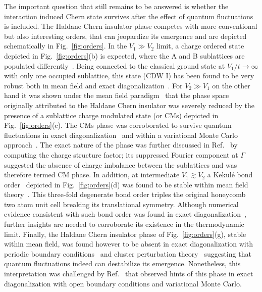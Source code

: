 \documentclass[aps,prx,10pt,twocolumn,floatfix,superscriptaddress,showpacs,numerical,footinbib]{revtex4-1}
\begin{document}
The important question that still remains to be answered is whether the interaction induced Chern state survives 
after the effect of quantum fluctuations is included.
%
The Haldane Chern insulator phase competes with more conventional but also interesting orders, 
that can jeopardize its emergence and are depicted schematically in Fig.~\ref{fig:orders}.
%
In the $V_{1} \gg V_{2}$ limit, a charge ordered state depicted in Fig.~\ref{fig:orders}(b) is expected, 
where the A and B sublattices are populated differently~\cite{RQHZ08,WCT14}.
%
Being connected to the classical ground state at $V_{1}/t \to \infty$ with only one occupied sublattice, this state (CDW I) has been found to be very robust both in mean field and exact diagonalization~\cite{GGNVC13,DH14}.
%
For $V_{2}\gg V_{1}$ on the other hand it was shown under the mean field paradigm~\cite{GCC13} that the phase space originally attributed to the Haldane Chern insulator 
was severely reduced by the presence of a sublattice charge modulated state (or CMs) depicted in Fig.~\ref{fig:orders}(c).
%
The CMs phase was corroborated to survive quantum fluctuations in exact diagonalization~\cite{GGNVC13,DH14,DCH14} 
and within a variational Monte Carlo approach~\cite{DCH14}.
%
The exact nature of the phase was further discussed in Ref.~\cite{DH14} by computing the charge structure factor; 
its suppressed Fourier component at $\Gamma$ suggested the absence of charge imbalance between the sublattices and 
was therefore termed CM phase.
%
In addition, at intermediate $V_{1}\gtrsim V_{2}$ a Kekul\'e bond order~\cite{C00,HCM07,RH10,RJH13} 
depicted in Fig.~\ref{fig:orders}(d) was found to be stable within mean field theory~\cite{WF10}.
%
This three-fold degenerate bond order triples the original honeycomb two atom unit cell breaking its translational symmetry.
%
Although numerical evidence consistent with such bond order was found in exact diagonalization~\cite{GGNVC13}, further insights are needed to corroborate its existence in the thermodynamic limit.
%
Finally, the Haldane Chern insulator phase of Fig.~\ref{fig:orders}(g), stable within mean field, was found however to be absent in exact diagonalization with periodic boundary conditions~\cite{GGNVC13,DH14} and cluster perturbation theory~\cite{DH14} suggesting that quantum fluctuations indeed can destabilize its emergence.
%
Nonetheless, this interpretation was challenged by Ref.~\cite{DCH14} that observed hints of this phase in exact diagonalization with open boundary conditions and variational Monte Carlo.\\
\end{document}

